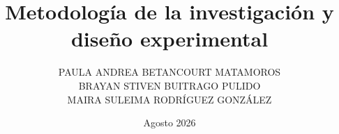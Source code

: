 \title{Metodología de la investigación y diseño experimental}
\author{
  PAULA ANDREA BETANCOURT MATAMOROS \\
  BRAYAN STIVEN BUITRAGO PULIDO \\
  MAIRA SULEIMA RODRÍGUEZ GONZÁLEZ
}
\date{Agosto 2026}
\maketitle